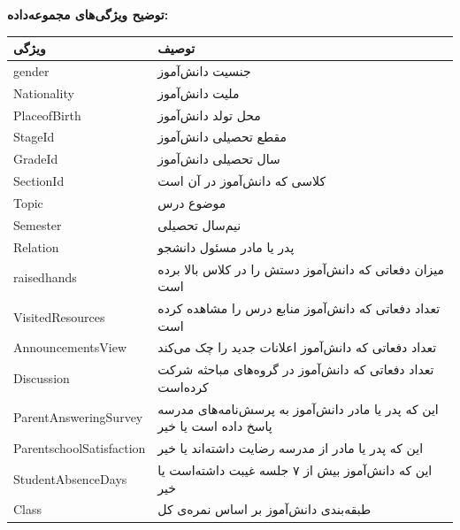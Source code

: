 \documentclass{article}
\begin{document}
\begin{large}
        \newpage
        \textbf{توضیح ویژگی‌های مجموعه‌داده:}
        \begin{center}
            \begin{tabular}{ | p{40mm} | p{100mm} | }
                \hline
                {\textbf{ویژگی}} & 
                {\textbf{توصیف}} \\
                \hline
                gender & جنسیت دانش‌آموز \\
                \hline
                Nationality & ملیت دانش‌آموز \\
                \hline
                PlaceofBirth & محل تولد دانش‌آموز \\
                \hline
                ‌StageId & مقطع تحصیلی دانش‌آموز \\
                \hline
                GradeId & سال تحصیلی دانش‌آموز \\
                \hline
                SectionId & کلاسی که دانش‌آموز در آن است \\
                \hline
                Topic & موضوع درس \\
                \hline
                Semester & نیم‌سال تحصیلی \\
                \hline
                Relation & پدر یا مادر مسئول دانشجو \\
                \hline
                raisedhands & میزان دفعاتی که دانش‌آموز دستش را در کلاس بالا برده است \\
                \hline
                VisitedResources & تعداد دفعاتی که دانش‌آموز منابع درس را مشاهده کرده است \\
                \hline
                AnnouncementsView & تعداد دفعاتی که دانش‌آموز اعلانات جدید را چک می‌کند \\
                \hline
                Discussion & تعداد دفعاتی که دانش‌آموز در گروه‌های مباحثه شرکت کرده‌است \\
                \hline
                ParentAnsweringSurvey & این که پدر یا مادر دانش‌آموز به پرسش‌نامه‌های مدرسه پاسخ داده است یا خیر \\
                \hline
                ParentschoolSatisfaction & این که پدر یا مادر از مدرسه رضایت داشته‌اند یا خیر \\
                \hline
                StudentAbsenceDays & این که دانش‌آموز بیش از ۷ جلسه غیبت داشته‌است یا خیر \\
                \hline
                Class & طبقه‌بندی دانش‌آموز بر اساس نمره‌ی کل \\
                \hline
            \end{tabular}
        \end{center}


\end{large}
\end{document}
